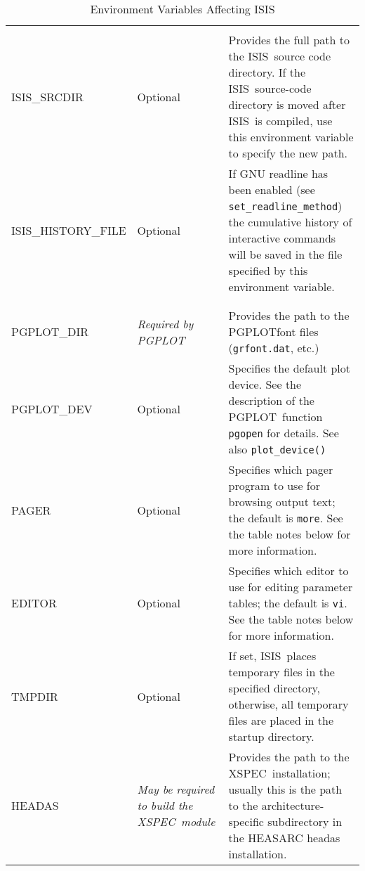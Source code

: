 \documentclass{book}
\newcommand{\isisx}{{\sc ISIS~}}
\newcommand{\isis}{{\sc ISIS}}
\newcommand{\pgplot}{{\sc PGPLOT}}
\newcommand{\xspec}{{\sc XSPEC}}
\begin{document}
\begin{samepage}
\begin{table}[ht] \caption{Environment Variables Affecting \isis}
\label{env-tbl}
\begin{tabular}{|l|p{0.8in}|p{3.2in}|}
\hline
\rule[-1mm]{0mm}{1mm} & & \hfill \\

{\sc ISIS\_SRCDIR} & Optional &
Provides the full path to the \isisx source code directory.
If the \isisx source-code directory is moved after \isisx is
compiled, use this environment variable to specify the new path.\\

{\sc ISIS\_HISTORY\_FILE} & Optional &
If GNU readline has been enabled (see \verb|set_readline_method|)
the cumulative history of interactive commands
will be saved in the file specified by this environment variable.\\

\rule[-1mm]{0mm}{1mm} & & \hfill \\
\hline
\rule[-1mm]{0mm}{1mm} & & \hfill \\

{\sc PGPLOT\_DIR} & {\it Required by \pgplot} &
Provides the path to the \pgplot font files ({\tt grfont.dat}, etc.)\\

{\sc PGPLOT\_DEV} & Optional &
Specifies the default plot device.  See the description of the \pgplot\
function {\tt pgopen} for details. See also \verb|plot_device()|\\

{\sc PAGER}  & Optional &
Specifies which pager program to use for browsing output text;
the default is {\tt more}.  See the table notes below for more
information.  \\

{\sc EDITOR} & Optional &
Specifies which editor to use for editing parameter tables; the default is
{\tt vi}.  See the table notes below for more
information. \\

{\sc TMPDIR} & Optional &
If set, \isisx places temporary files in the specified directory, otherwise,
all temporary files are placed in the startup directory. \\

{\sc HEADAS} & {\it May be required to build the \xspec\ module} &
Provides the path to the \xspec\ installation; usually this is the
path to the architecture-specific subdirectory
in the HEASARC headas installation. \\


\end{tabular}
\end{table}
\end{samepage}
\end{document}
